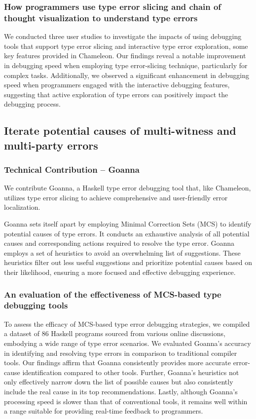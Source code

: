 \subsubsection{How programmers use type error slicing and chain of thought visualization to understand type errors}
We conducted three user studies to investigate the impacts of using debugging tools that support type error slicing and interactive type error exploration, some key features provided in Chameleon. Our findings reveal a notable improvement in debugging speed when employing type error-slicing technique, particularly for complex tasks. Additionally, we observed a significant enhancement in debugging speed when programmers engaged with the interactive debugging features, suggesting that active exploration of type errors can positively impact the debugging process.

\subsection{Iterate potential causes of multi-witness and multi-party errors}

\subsubsection{Technical Contribution -- Goanna}

We contribute Goanna, a Haskell type error debugging tool that, like Chameleon, utilizes type error slicing to achieve comprehensive and user-friendly error localization.

Goanna sets itself apart by employing Minimal Correction Sets (MCS) to identify potential causes of type errors. It conducts an exhaustive analysis of all potential causes and corresponding actions required to resolve the type error. Goanna employs a set of heuristics to avoid an overwhelming list of suggestions. These heuristics filter out less useful suggestions and prioritize potential causes based on their likelihood, ensuring a more focused and effective debugging experience.


\subsubsection{An evaluation of the effectiveness of MCS-based type debugging tools}
To assess the efficacy of MCS-based type error debugging strategies, we compiled a dataset of 86 Haskell programs sourced from various online discussions, embodying a wide range of type error scenarios. We evaluated Goanna's accuracy in identifying and resolving type errors in comparison to traditional compiler tools. Our findings affirm that Goanna consistently provides more accurate error-cause identification compared to other tools. Further, Goanna's heuristics not only effectively narrow down the list of possible causes but also consistently include the real cause in its top recommendations. Lastly, although Goanna's processing speed is slower than that of conventional tools, it remains well within a range suitable for providing real-time feedback to programmers. 

